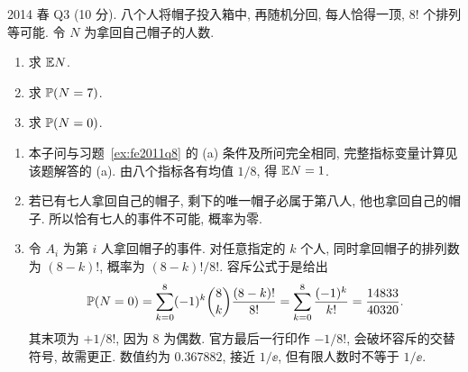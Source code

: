 \begin{exercise}\label{ex:fe2014q3}
2014 春 Q3 (10 分). 八个人将帽子投入箱中, 再随机分回, 每人恰得一顶, $8!$ 个排列等可能. 令 $N$ 为拿回自己帽子的人数.
\begin{enumerate}[label=(\alph*)]
\item\label{ex:fe2014q3-a} 求 $\mathbb E N$.
\item\label{ex:fe2014q3-b} 求 $\mathbb P(N=7)$.
\item\label{ex:fe2014q3-c} 求 $\mathbb P(N=0)$.
\end{enumerate}
\end{exercise}
\begin{solution}
\begin{enumerate}[label=(\alph*)]
\item\label{sol:fe2014q3-a} 本子问与习题~\ref{ex:fe2011q8} 的 (a) 条件及所问完全相同, 完整指标变量计算见该题解答的 (a). 由八个指标各有均值 $1/8$, 得 $\mathbb E N=1$.
\item\label{sol:fe2014q3-b} 若已有七人拿回自己的帽子, 剩下的唯一帽子必属于第八人, 他也拿回自己的帽子. 所以恰有七人的事件不可能, 概率为零.
\item\label{sol:fe2014q3-c} 令 $A_i$ 为第 $i$ 人拿回帽子的事件. 对任意指定的 $k$ 个人, 同时拿回帽子的排列数为 $(8-k)!$, 概率为 $(8-k)!/8!$. 容斥公式于是给出
\[
 \mathbb P(N=0)=\sum_{k=0}^8(-1)^k\binom8k\frac{(8-k)!}{8!}
 =\sum_{k=0}^8\frac{(-1)^k}{k!}
 =\frac{14833}{40320}.
\]
其末项为 $+1/8!$, 因为 $8$ 为偶数. 官方最后一行印作 $-1/8!$, 会破坏容斥的交替符号, 故需更正. 数值约为 $0.367882$, 接近 $1/\ee$, 但有限人数时不等于 $1/\ee$.
\end{enumerate}
\end{solution}

